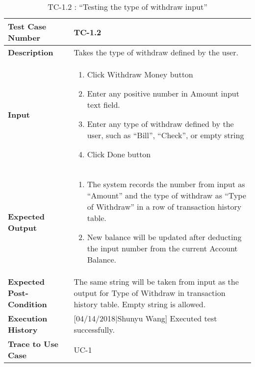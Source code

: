 \documentclass[12pt]{article}
\begin{document}
\begin{table}[H]
\caption{TC-1.2 : “Testing the type of withdraw input”}
\begin{center}
\begin{tabular}{|p{5 cm}|p{12cm}|}
\hline
\bf Test Case Number & 
TC-1.2 \\
\hline
\bf Description & 
Takes the type of withdraw defined by the user.\\
\hline
\bf Input & 
\begin{enumerate}
  \item Click Withdraw Money button
  \item Enter any positive number in Amount input text field.
  \item Enter any type of withdraw defined by the user, such as “Bill”, “Check”, or empty string
  \item Click Done button
\end{enumerate} \\
\hline
\bf Expected Output & 
\begin{enumerate}
  \item The system records the number from input as “Amount” and the type of withdraw as “Type of Withdraw” in a row of transaction history table.
  \item New balance will be updated after deducting the input number from the current Account Balance.
\end{enumerate} \\
\hline
\bf Expected Post-Condition & 
The same string will be taken from input as the output for Type of Withdraw in transaction history table. Empty string is allowed.\\
\hline
\bf Execution History & 
[04/14/2018|Shunyu Wang] Executed test successfully.\\
\hline
\bf Trace to Use Case & 
UC-1\\
\hline

\end{tabular}
\end{center}
\end{table}
\end{document}
